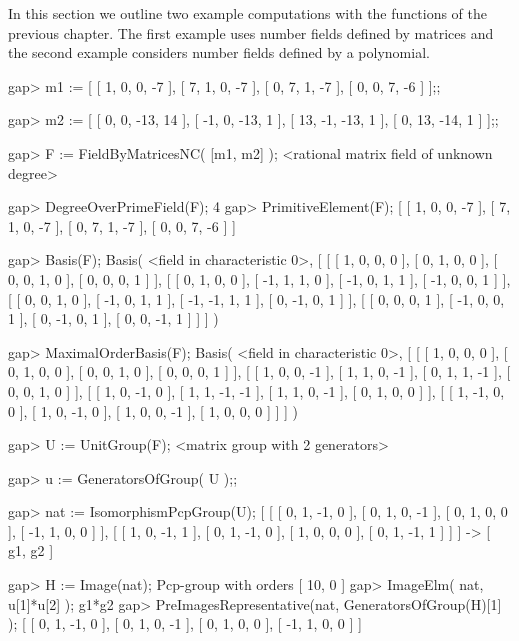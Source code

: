

In this section we outline two example computations with the functions
of the previous chapter. The first example uses number fields defined 
by matrices and the second example considers number fields defined by
a polynomial.


\beginexample
gap> m1 := [ [ 1, 0, 0, -7 ], 
             [ 7, 1, 0, -7 ], 
             [ 0, 7, 1, -7 ],
             [ 0, 0, 7, -6 ] ];;

gap> m2 := [ [ 0, 0, -13, 14 ], 
             [ -1, 0, -13, 1 ], 
             [ 13, -1, -13, 1 ], 
             [ 0, 13, -14, 1 ] ];;

gap> F := FieldByMatricesNC( [m1, m2] );
<rational matrix field of unknown degree>

gap> DegreeOverPrimeField(F);
4
gap> PrimitiveElement(F);
[ [ 1, 0, 0, -7 ], [ 7, 1, 0, -7 ], [ 0, 7, 1, -7 ], [ 0, 0, 7, -6 ] ]

gap> Basis(F);
Basis( <field in characteristic 0>, 
[ [ [ 1, 0, 0, 0 ], [ 0, 1, 0, 0 ], [ 0, 0, 1, 0 ], [ 0, 0, 0, 1 ] ], 
  [ [ 0, 1, 0, 0 ], [ -1, 1, 1, 0 ], [ -1, 0, 1, 1 ], [ -1, 0, 0, 1 ] ], 
  [ [ 0, 0, 1, 0 ], [ -1, 0, 1, 1 ], [ -1, -1, 1, 1 ], [ 0, -1, 0, 1 ] ], 
  [ [ 0, 0, 0, 1 ], [ -1, 0, 0, 1 ], [ 0, -1, 0, 1 ], [ 0, 0, -1, 1 ] ] ] )

gap> MaximalOrderBasis(F);
Basis( <field in characteristic 0>, 
[ [ [ 1, 0, 0, 0 ], [ 0, 1, 0, 0 ], [ 0, 0, 1, 0 ], [ 0, 0, 0, 1 ] ], 
  [ [ 1, 0, 0, -1 ], [ 1, 1, 0, -1 ], [ 0, 1, 1, -1 ], [ 0, 0, 1, 0 ] ], 
  [ [ 1, 0, -1, 0 ], [ 1, 1, -1, -1 ], [ 1, 1, 0, -1 ], [ 0, 1, 0, 0 ] ], 
  [ [ 1, -1, 0, 0 ], [ 1, 0, -1, 0 ], [ 1, 0, 0, -1 ], [ 1, 0, 0, 0 ] ] ] )

gap> U := UnitGroup(F);
<matrix group with 2 generators>

gap> u := GeneratorsOfGroup( U );;

gap> nat := IsomorphismPcpGroup(U);
[ [ [ 0, 1, -1, 0 ], [ 0, 1, 0, -1 ], [ 0, 1, 0, 0 ], [ -1, 1, 0, 0 ] ], 
  [ [ 1, 0, -1, 1 ], [ 0, 1, -1, 0 ], [ 1, 0, 0, 0 ], [ 0, 1, -1, 1 ] ] ] -> 
[ g1, g2 ]

gap> H := Image(nat);
Pcp-group with orders [ 10, 0 ]
gap> ImageElm( nat, u[1]*u[2] );
g1*g2
gap> PreImagesRepresentative(nat, GeneratorsOfGroup(H)[1] );
[ [ 0, 1, -1, 0 ], [ 0, 1, 0, -1 ], [ 0, 1, 0, 0 ], [ -1, 1, 0, 0 ] ]
\endexample


